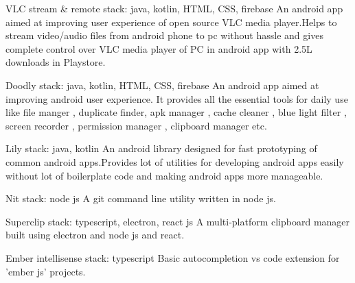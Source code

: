 
\begin{cventries}
  \cvproject
    {VLC stream \& remote} %
    {stack: java, kotlin, HTML, CSS, firebase} %
    { \quad An android app aimed at improving user experience of open source VLC media player.Helps to stream video/audio files from android phone to pc without hassle and gives complete control over VLC media player of PC in android app with 2.5L downloads in Playstore.} %
  
  \cvproject
    {Doodly}
    {stack: java, kotlin, HTML, CSS, firebase} %
    { \quad An android app aimed at improving android user experience. It provides all the essential tools for daily use like file manger , duplicate finder, apk manager , cache cleaner , blue light filter , screen recorder , permission manager , clipboard manager etc.}

  \cvproject
    {Lily}
    {stack: java, kotlin} %
    { \quad An android library designed for fast prototyping of common android apps.Provides lot of utilities for developing android apps easily without lot of boilerplate code and making android apps more manageable.}

  \cvproject
    {Nit}
    {stack: node js} %
    { \quad A git command line utility written in node js.}

  \cvproject
    {Superclip}
    {stack: typescript, electron, react js} %
    { \quad A multi-platform clipboard manager built using electron and node js and react.}
  
  \cvproject
    {Ember intellisense}
    {stack: typescript} %
    { \quad Basic autocompletion vs code extension for 'ember js' projects.}

\end{cventries}
